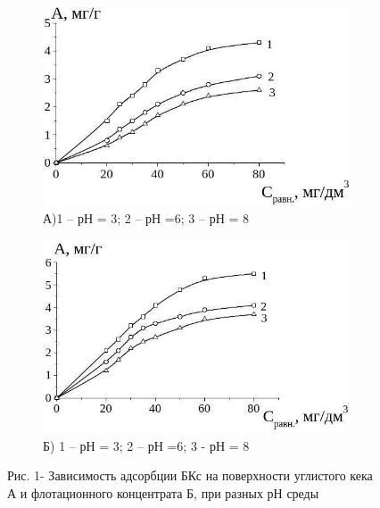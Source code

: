 \begin{figure}[H]
    \centering
    \begin{subfigure}[b]{0.45\textwidth}
        \centering
        \includegraphics[width=\textwidth]{assets/1033}
        \caption*{А)1 -- рН = 3; 2 -- рН =6; 3 -- рН = 8}
    \end{subfigure}
    \hfill
    \begin{subfigure}[b]{0.45\textwidth}
        \centering
        \includegraphics[width=\textwidth]{assets/1034}
        \caption*{Б) 1 -- рН = 3; 2 -- рН =6; 3 - рН = 8}
    \end{subfigure}
    \caption*{Рис. 1- Зависимость адсорбции БКс на поверхности углистого кека А и флотационного концентрата Б, при разных рН среды}
\end{figure}


